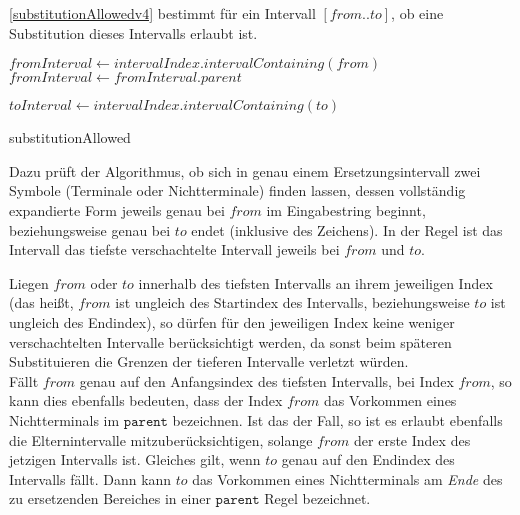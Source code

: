 \autoref{substitutionAllowedv4} bestimmt für ein Intervall $[from..to]$, ob eine Substitution dieses Intervalls erlaubt ist. 
\begin{algorithm}[t]
    $fromInterval \leftarrow intervalIndex.intervalContaining(from)$\;
     {
        $fromInterval \leftarrow fromInterval.parent$\;
    }

     {
        \KwRet{\KwFalse}
    }

    $toInterval \leftarrow intervalIndex.intervalContaining(to)$\;
    
    \caption{substitutionAllowed}
    \label{substitutionAllowedv4}
\end{algorithm}
Dazu prüft der Algorithmus, ob sich in genau einem Ersetzungsintervall zwei Symbole (Terminale oder Nichtterminale) finden lassen, dessen vollständig expandierte Form jeweils genau bei $from$ im Eingabestring beginnt, beziehungsweise genau bei $to$ endet (inklusive des Zeichens).
In der Regel ist das Intervall das tiefste verschachtelte Intervall jeweils bei $from$ und $to$. 

Liegen $from$ oder $to$ innerhalb des tiefsten Intervalls an ihrem jeweiligen Index (das heißt, $from$ ist ungleich des Startindex des Intervalls, beziehungsweise $to$ ist ungleich des Endindex), so dürfen für den jeweiligen Index keine weniger verschachtelten Intervalle berücksichtigt werden, da sonst beim späteren Substituieren die Grenzen der tieferen Intervalle verletzt würden.\\ 
Fällt $from$ genau auf den Anfangsindex des tiefsten Intervalls, bei Index $from$, so kann dies ebenfalls bedeuten, dass der Index $from$ das Vorkommen eines Nichtterminals im $\texttt{parent}$ bezeichnen. Ist das der Fall, so ist es erlaubt ebenfalls die Elternintervalle mitzuberücksichtigen, solange $from$ der erste Index des jetzigen Intervalls ist. Gleiches gilt, wenn $to$ genau auf den Endindex des Intervalls fällt. Dann kann $to$ das Vorkommen eines Nichtterminals am \emph{Ende} des zu ersetzenden Bereiches in einer $\texttt{parent}$ Regel bezeichnet.

